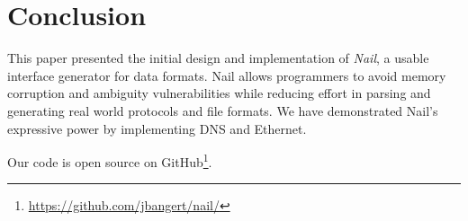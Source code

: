 \section{Conclusion}
\label{s:concl}
This paper presented the initial design and implementation of \textit{Nail}, a usable interface
generator for data formats. Nail allows programmers to avoid memory corruption and ambiguity
vulnerabilities while reducing effort in parsing and generating real world protocols and file
formats. We have demonstrated Nail's expressive power by implementing DNS and Ethernet. 

Our code is open source on GitHub\footnote{\url{https://github.com/jbangert/nail/}}.
